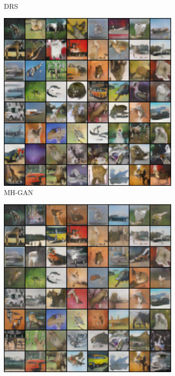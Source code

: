 \begin{figure}[htbp]
\begin{subfigure}[b]{0.49\textwidth}
       \caption{DRS}
    \end{subfigure}
    \begin{subfigure}[b]{0.49\textwidth}
       \centering
       \includegraphics[width=\exfactor\textwidth]{figures/cifar/192_base_raw_MH_smaller_bigger.png}
       \caption{MH-GAN}
    \end{subfigure}
    \begin{subfigure}[b]{0.49\textwidth}
       \centering
       \includegraphics[width=\exfactor\textwidth]{figures/cifar/192_base_iso_MH_smaller_bigger.png}

\end{subfigure}
\end{figure}
